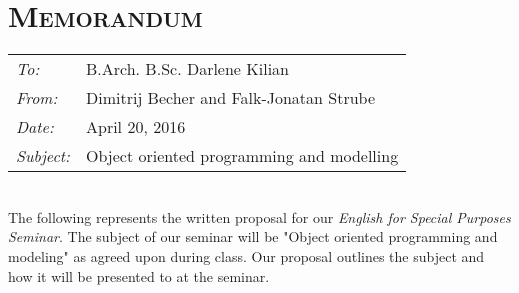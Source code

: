 
\renewcommand{\workingdir}{../../../}



\DNotiz{}
\renewcommand{\Dokumentensignatur}{}




\chapter*{\textsc{Memorandum}}
\begin{tabular}{l l}
\emph{To:} & B.Arch. B.Sc. Darlene Kilian\\
\emph{From:} & Dimitrij Becher and Falk-Jonatan Strube\\
\emph{Date:} & April 20, 2016\\
\emph{Subject:} & Object oriented programming and modelling\\
\end{tabular}\medskip\\
The following represents the written proposal for our \emph{English for Special Purposes Seminar}. The subject of our seminar will be "Object oriented programming and modeling" as agreed upon during class. Our proposal outlines the subject and how it will be presented to at the seminar. 


